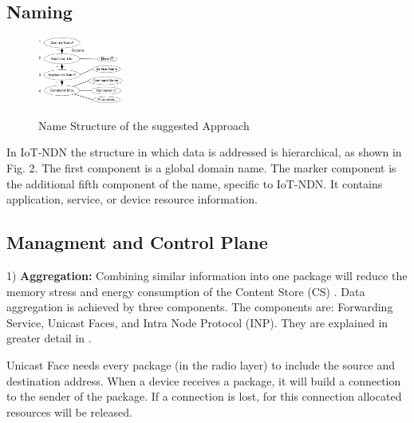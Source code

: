 \documentclass[conference]{IEEEtran}
\begin{document}
  \subsection{Naming}
  \begin{figure}[h]
      \centering
      \includegraphics[width=0.25\textwidth]{Name_Structure_of_the_suggested_Approach.png}\\
      \caption{Name Structure of the suggested Approach}
      \label{fig:enter-label}
  \end{figure}
  
  In IoT-NDN the structure in which data is addressed is hierarchical, as shown in Fig. 2.
  The first component is a global domain name. 
  The marker component is the additional fifth component of the name, specific to IoT-NDN.
  It contains application, service, or device resource information.
  
  \subsection{Managment and Control Plane}
  1) \textbf{Aggregation:} Combining similar information into one package will reduce the memory stress and energy consumption of the Content Store (CS) \cite{b5}.
  Data aggregation is achieved by three components. The components are: Forwarding Service, Unicast Faces, and Intra Node Protocol (INP). They are explained in greater detail in \cite{b5}.
  
  Unicast Face needs every package (in the radio layer) to include the source and destination address. 
  When a device receives a package, it will build a connection to the sender of the package. 
  If a connection is lost, for this connection allocated resources will be released. 
  
\end{document}
